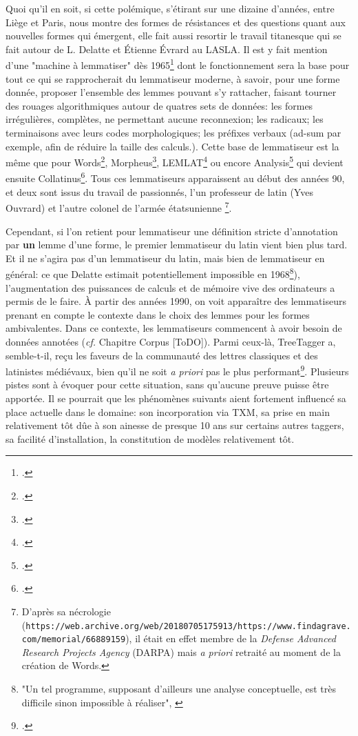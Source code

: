 Quoi qu'il en soit, si cette polémique, s'étirant sur une dizaine d'années, entre Liège et Paris, nous montre des formes de résistances et des questions quant aux nouvelles formes qui émergent, elle fait aussi resortir le travail titanesque qui se fait autour de L. Delatte et Étienne Évrard au LASLA. Il est y fait mention d'une "machine à lemmatiser" dès 1965\footcite{delatte_programme_1965} dont le fonctionnement sera la base pour tout ce qui se rapprocherait du lemmatiseur moderne, à savoir, pour une forme donnée, proposer l'ensemble des lemmes pouvant s'y rattacher, faisant tourner des rouages algorithmiques autour de quatres sets de données: les formes irrégulières, complètes, ne permettant aucune reconnexion; les radicaux; les terminaisons avec leurs codes morphologiques; les préfixes verbaux (ad-sum par exemple, afin de réduire la taille des calculs.). Cette base de lemmatiseur est la même que pour Words\footcite{whitaker_words_1993}, Morpheus\footcite{crane_generating_1991}, LEMLAT\footcite{bozzi_lemlat_1992} ou encore Analysis\footcite{ouvrard_analysis_1992} qui devient ensuite Collatinus\footcite{ouvrard_collatinus_1999}. Tous ces lemmatiseurs apparaissent au début des années 90, et deux sont issus du travail de passionnés, l'un professeur de latin (Yves Ouvrard) et l'autre colonel de l'armée étatsunienne \footnote{D'après sa nécrologie (\texttt{https://web.archive.org/web/20180705175913/https://www.findagrave.com/memorial/66889159}), il était en effet membre de la \textit{Defense Advanced Research Projects Agency} (DARPA) mais \textit{a priori} retraité au moment de la création de Words.}.

Cependant, si l'on retient pour lemmatiseur une définition stricte d'annotation par \textbf{un} lemme d'une forme, le premier lemmatiseur du latin vient bien plus tard. Et il ne s'agira pas d'un lemmatiseur du latin, mais bien de lemmatiseur en général: ce que Delatte estimait potentiellement impossible en 1968\footnote{"Un tel programme, supposant d'ailleurs une analyse conceptuelle, est très difficile sinon impossible à réaliser", \cite[p.~100]{delatte_index_1968}}), l'augmentation des puissances de calculs et de mémoire vive des ordinateurs a permis de le faire. À partir des années 1990, on voit apparaître des lemmatiseurs prenant en compte le contexte dans le choix des lemmes pour les formes ambivalentes. %
Dans ce contexte, les lemmatiseurs commencent à avoir besoin de données annotées (\textit{cf.} Chapitre Corpus [ToDO]). Parmi ceux-là, TreeTagger a, semble-t-il, reçu les faveurs de la communauté des lettres classiques et des latinistes médiévaux, bien qu'il ne soit \textit{a priori} pas le plus performant\footcite[Voir]{eger_lexicon-assisted_2015}. Plusieurs pistes sont à évoquer pour cette situation, sans qu'aucune preuve puisse être apportée. Il se pourrait que les phénomènes suivants aient fortement influencé sa place actuelle dans le domaine: son incorporation via TXM, sa prise en main relativement tôt dûe à son ainesse de presque 10 ans sur certains autres taggers, sa facilité d'installation, la constitution de modèles relativement tôt. 


